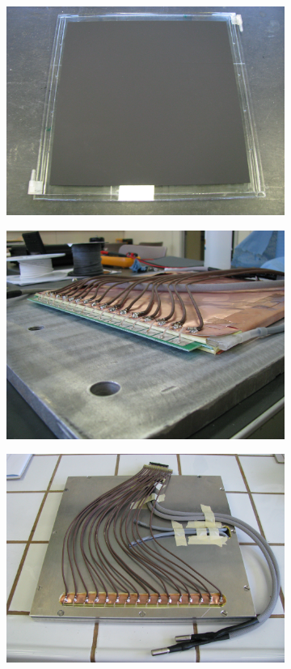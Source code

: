 	\begin{figure}[H]
		\begin{subfigure}{.5\linewidth}
		    \centering
			\includegraphics[width = .9\linewidth]{fig/chapt6/gRPC-gap.JPG}
			\caption{\label{fig:UGent-gRPC-pictures:A}}
		\end{subfigure}
		\begin{subfigure}{.5\linewidth}
		    \centering
			\includegraphics[width = .9\linewidth]{fig/chapt6/gRPC-faraday.JPG}
			\caption{\label{fig:UGent-gRPC-pictures:B}}
		\end{subfigure}
		\begin{subfigure}{\linewidth}
		    \centering
			\includegraphics[width = .45\linewidth]{fig/chapt6/gRPC-case.JPG}

\end{subfigure}
\end{figure}
